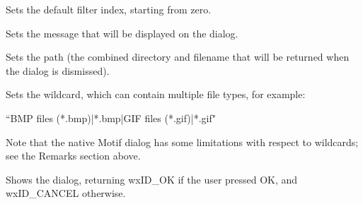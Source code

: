 Sets the default filter index, starting from zero.

\label{wxfiledialogsetmessage}


Sets the message that will be displayed on the dialog.

\label{wxfiledialogsetpath}


Sets the path (the combined directory and filename that will be returned when the dialog is dismissed).

\label{wxfiledialogsetwildcard}


Sets the wildcard, which can contain multiple file types, for example:

``BMP files (*.bmp)|*.bmp|GIF files (*.gif)|*.gif"

Note that the native Motif dialog has some limitations with respect to
wildcards; see the Remarks section above.

\label{wxfiledialogshowmodal}


Shows the dialog, returning wxID\_OK if the user pressed OK, and wxID\_CANCEL
otherwise.



